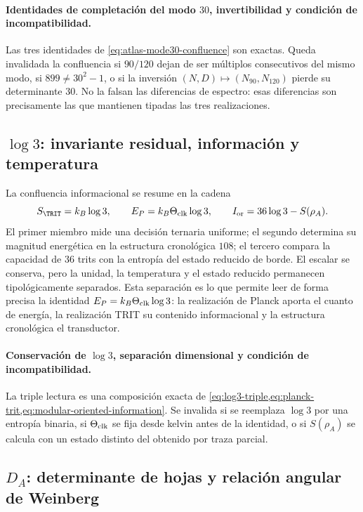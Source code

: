 \paragraph{Identidades de completación del modo \(30\), invertibilidad y condición de incompatibilidad.}
Las tres identidades de \cref{eq:atlas-mode30-confluence} son exactas. Queda
invalidada la confluencia si \(90/120\) dejan de ser m\'ultiplos consecutivos del
mismo modo, si \(899\ne30^2-1\), o si la inversi\'on
\((N,D)\mapsto(N_{90},N_{120})\) pierde su determinante \(30\). No la falsan
las diferencias de espectro: esas diferencias son precisamente las que
mantienen tipadas las tres realizaciones.

\subsection{\(\log3\): invariante residual, informaci\'on y temperatura}

La confluencia informacional se resume en la cadena
\begin{equation}
S_{\TRIT}=k_B\log3,\qquad
E_P=k_B\Theta_{\rm clk}\log3,\qquad
I_{\rm or}=36\log3-S(\rho_A).
\label{eq:atlas-log3-confluence}
\end{equation}
El primer miembro mide una decisi\'on ternaria uniforme; el segundo determina
su magnitud energ\'etica en la estructura cronol\'ogica \(108\); el tercero compara la
capacidad de \(36\) trits con la entrop\'ia del estado reducido de borde.
El escalar se conserva,
pero la unidad, la temperatura y el estado reducido permanecen tipol\'ogicamente
separados. Esta
separaci\'on es lo que permite leer de forma precisa la identidad
\(E_P=k_B\Theta_{\rm clk}\log3\): la realizaci\'on de Planck aporta el cuanto
de energ\'ia, la realizaci\'on TRIT su contenido informacional y la estructura
cronol\'ogica el transductor.

\paragraph{Conservación de \(\log 3\), separación dimensional y condición de incompatibilidad.}
La triple lectura es una composici\'on exacta de
\cref{eq:log3-triple,eq:planck-trit,eq:modular-oriented-information}. Se
invalida si se reemplaza \(\log3\) por una entrop\'ia binaria, si
\(\Theta_{\rm clk}\) se fija desde kelvin antes de la identidad, o si
\(S(\rho_A)\) se calcula con un estado distinto del obtenido por traza parcial.

\subsection{\texorpdfstring{\(D_A\)}{Determinante angular}: determinante de hojas y relaci\'on angular de Weinberg}

